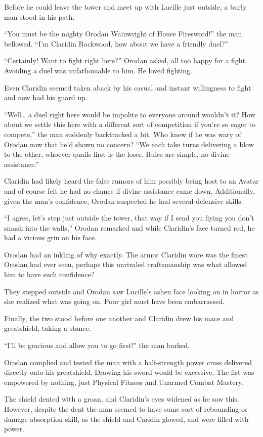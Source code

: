 \documentclass[a4paper,10pt]{book}
\begin{document}
Before he could leave the tower and meet up with Lucille just outside, a burly man stood in his path.\par
“You must be the mighty Orodan Wainwright of House Firesword!” the man bellowed. “I’m Claridin Rockwood, how about we have a friendly duel?”\par
“Certainly! Want to fight right here?” Orodan asked, all too happy for a fight. Avoiding a duel was unfathomable to him. He loved fighting.\par
Even Claridin seemed taken aback by his casual and instant willingness to fight and now had his guard up.\par
“Well… a duel right here would be impolite to everyone around wouldn’t it? How about we settle this here with a different sort of competition if you’re so eager to compete,” the man suddenly backtracked a bit. Who knew if he was wary of Orodan now that he’d shown no concern? “We each take turns delivering a blow to the other, whoever quails first is the loser. Rules are simple, no divine assistance.”\par
Claridin had likely heard the false rumors of him possibly being host to an Avatar and of course felt he had no chance if divine assistance came down. Additionally, given the man’s confidence, Orodan suspected he had several defensive skills.\par
“I agree, let’s step just outside the tower, that way if I send you flying you don’t smash into the walls,” Orodan remarked and while Claridin’s face turned red, he had a vicious grin on his face.\par
Orodan had an inkling of why exactly. The armor Claridin wore was the finest Orodan had ever seen, perhaps this unrivaled craftsmanship was what allowed him to have such confidence?\par
They stepped outside and Orodan saw Lucille’s ashen face looking on in horror as she realized what was going on. Poor girl must have been embarrassed.\par
Finally, the two stood before one another and Claridin drew his mace and greatshield, taking a stance.\par
“I’ll be gracious and allow you to go first!” the man barked.\par
Orodan complied and tested the man with a half-strength power cross delivered directly onto his greatshield. Drawing his sword would be excessive. The fist was empowered by nothing, just Physical Fitness and Unarmed Combat Mastery.\par
The shield dented with a groan, and Claridin’s eyes widened as he saw this. However, despite the dent the man seemed to have some sort of rebounding or damage absorption skill, as the shield and Caridin glowed, and were filled with power.\par
\end{document}

